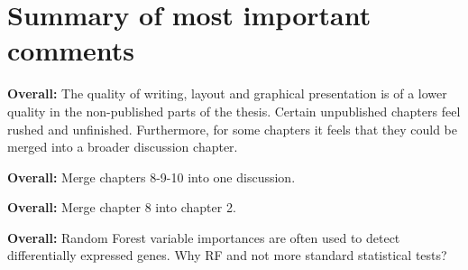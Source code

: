 \documentclass[10pt]{article}
\begin{document}
\section{Summary of most important comments}

\textbf{Overall:} The quality of writing, layout and graphical presentation is of a lower quality in the non-published parts of the thesis. Certain unpublished chapters feel rushed and unfinished. Furthermore, for some chapters it feels that they could be merged into a broader discussion chapter.

\textbf{Overall:} Merge chapters 8-9-10 into one discussion.

\textbf{Overall:} Merge chapter 8 into chapter 2.

\textbf{Overall:} Random Forest variable importances are often used to detect differentially expressed genes. Why RF and not more standard statistical tests?
\end{document}
